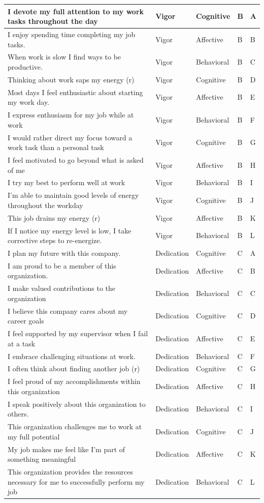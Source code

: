 \documentclass[
]{book}
\begin{document}
\begin{table}
\begin{tabular}[t]{l|l|l|l|l}
\hline
I devote my full attention to my work tasks throughout the day & Vigor & Cognitive & B & A\\
\hline
I enjoy spending time completing my job tasks. & Vigor & Affective & B & B\\
\hline
When work is slow I find ways to be productive. & Vigor & Behavioral & B & C\\
\hline
Thinking about work saps my energy (r) & Vigor & Cognitive & B & D\\
\hline
Most days I feel enthusiastic about starting my work day. & Vigor & Affective & B & E\\
\hline
I express enthusiasm for my job while at work & Vigor & Behavioral & B & F\\
\hline
I would rather direct my focus toward a work task than a personal task & Vigor & Cognitive & B & G\\
\hline
I feel motivated to go beyond what is asked of me & Vigor & Affective & B & H\\
\hline
I try my best to perform well at work & Vigor & Behavioral & B & I\\
\hline
I’m able to maintain good levels of energy throughout the workday & Vigor & Cognitive & B & J\\
\hline
This job drains my energy (r) & Vigor & Affective & B & K\\
\hline
If I notice my energy level is low, I take corrective steps to re-energize. & Vigor & Behavioral & B & L\\
\hline
I plan my future with this company. & Dedication & Cognitive & C & A\\
\hline
I am proud to be a member of this organization. & Dedication & Affective & C & B\\
\hline
I make valued contributions to the organization & Dedication & Behavioral & C & C\\
\hline
I believe this company cares about my career goals & Dedication & Cognitive & C & D\\
\hline
I feel supported by my supervisor when I fail at a task & Dedication & Affective & C & E\\
\hline
I embrace challenging situations at work. & Dedication & Behavioral & C & F\\
\hline
I often think about finding another job (r) & Dedication & Cognitive & C & G\\
\hline
I feel proud of my accomplishments within this organization & Dedication & Affective & C & H\\
\hline
I speak positively about this organization to others. & Dedication & Behavioral & C & I\\
\hline
This organization challenges me to work at my full potential & Dedication & Cognitive & C & J\\
\hline
My job makes me feel like I’m part of something meaningful & Dedication & Affective & C & K\\
\hline
This organization provides the resources necessary for me to successfully perform my job & Dedication & Behavioral & C & L\\
\hline
\end{tabular}
\end{table}
\end{document}

